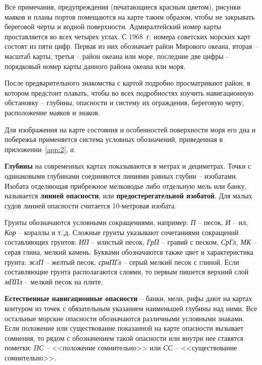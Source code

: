 \documentclass[a4paper, 12pt, twoside, final, book, russian, fittopage, cyremdash]{ncc}
\begin{document}
Все примечания, предупреждения (печатающиеся красным цветом), рисунки маяков и планы портов помещаются на карте таким образом, чтобы не закрывать береговой черты и водной поверхности. Адмиралтейский номер карты проставляется во всех четырех углах. С 1968~г. номера советских морских карт состоят из пяти цифр. Первая из них обозначает район Мирового океана, вторая \--- масштаб карты, третья \--- район океана или море, последние две цифры \--- порядковый номер карты данного района океана или моря. 

После предварительного знакомства с картой подробно просматривают район, в котором предстоит плавать, чтобы во всех подробностях изучить навигационную обстановку \--- глубины, опасности и систему их ограждения, береговую черту, расположение маяков и знаков. 

Для изображения на карте состояния и особенностей поверхности моря его дна и побережья применяется система условных обозначений, приведенная в приложении~\ref{app:2}, \textit{а}. 

\textbf{Глубины} на современных картах показываются в метрах и дециметрах. Точки с одинаковыми глубинами соединяются линиями равных глубин \--- изобатами. Изобата отделяющая прибрежное мелководье либо отдельную мель или банку, называется \textbf{линией опасности}, или \textbf{предостерегательной изобатой}. Для малых судов линией опасности считается 10-метровая изобата. 

Грунты обозначаются условными сокращениями, например: \textit{П} \--- песок, \textit{И} \--- ил, \textit{Кор} \--- кораллы и т.\=,д. Сложные грунты указывают сочетаниями сокращений составляющих грунтов: \textit{ИП} \--- илистый песок, \textit{ГрП} \--- гравий с песком, \textit{СрГл, МК} \--- серая глина, мелкий камень. Буквами обозначаются также цвет и характеристика грунта: \textit{жлП} \--- желтый песок, \textit{срмПГл} \--- серый мелкий песок с глиной. Если составляющие грунта располагаются слоями, то первым пишется верхний слой \textit{мППл} \--- мелкий песок на плите. 

\textbf{Естественные навигационные опасности} \--- банки, мели, рифы дают на картах контуром из точек с обязательным указанием наименьшей глубины над ними. Все остальные морские опасности обозначаются различными условными знаками. Если положение или существование показанной на карте опасности вызывает сомнения, то рядом с обозначением такой опасности или внутри нее ставятся пометки: \textit{ПС} \--- <<положение сомнительно>> или \textit{СС} \--- <<существование сомнительно>>. 
\end{document}
